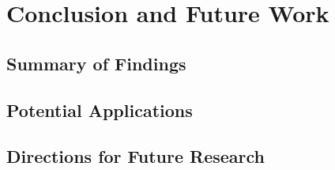 \chapter{Conclusion and Future Work}

\section{Summary of Findings}

\section{Potential Applications}

\section{Directions for Future Research}